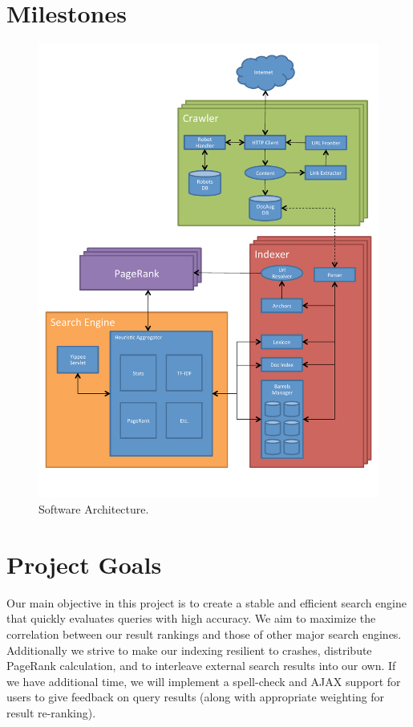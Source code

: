 \documentclass[11pt, letterpaper, oneside, twocolumn]{article}
\begin{document}
\section{ Milestones }

\label{sec:SOAR} %
\begin{figure}[!b]
  \centering
  \includegraphics[scale=0.50]{figures/yippee_map.pdf}
  \caption{Software Architecture.}
\end{figure}



\section{ Project Goals }

Our main objective in this project is to create a stable and efficient search engine that quickly evaluates queries with high accuracy. We aim to maximize the correlation between our result rankings and those of other major search engines. Additionally we strive to make our indexing resilient to crashes, distribute PageRank calculation, and to interleave external search results into our own. If we have additional time, we will implement a spell-check and AJAX support for users to give feedback on query results (along with appropriate weighting for result re-ranking).
\end{document}
